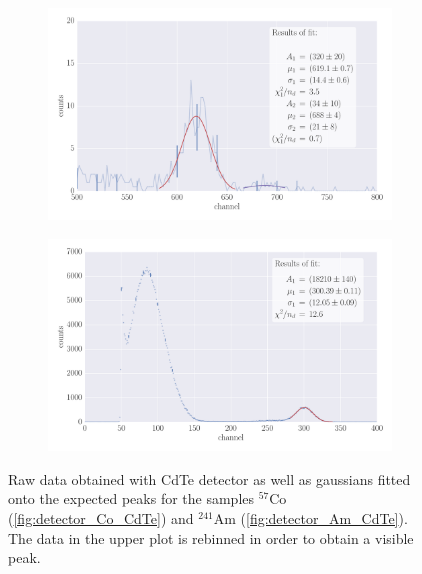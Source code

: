 \begin{figure}
    \centering
    \begin{subfigure}[b]{\pltw}
        \includegraphics[width=1.0\linewidth]{figures/detector_Co_Si}
        \caption{}
        \label{fig:detector_Co_Si}
    \end{subfigure}
    \begin{subfigure}[b]{\pltw}
        \includegraphics[width=1.0\linewidth]{figures/detector_Am_Si}
        \caption{}
        \label{fig:detector_Am_Si}
    \end{subfigure}
    \caption{
        Raw data obtained with CdTe detector as well as gaussians fitted 
        onto the expected peaks for the samples $^{57}$Co (\ref{fig:detector_Co_CdTe})
        and $^{241}$Am (\ref{fig:detector_Am_CdTe}). The data in the upper plot is rebinned 
        in order to obtain a visible peak.
        }
    \label{fig:detector_Si}
\end{figure}

